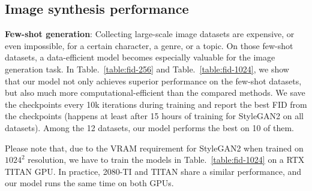 \documentclass{article} \usepackage{iclr2021_conference,times}
\begin{document}
\subsection{Image synthesis performance}
\textbf{Few-shot generation}: Collecting large-scale image datasets are expensive, or even impossible, for a certain character, a genre, or a topic. On those few-shot datasets, a data-efficient model becomes especially valuable for the image generation task. In Table.~\ref{table:fid-256} and Table.~\ref{table:fid-1024}, we show that our model not only achieves superior performance on the few-shot datasets, but also much more computational-efficient than the compared methods. We save the checkpoints every 10k iterations during training and report the best FID from the checkpoints (happens at least after 15 hours of training for StyleGAN2 on all datasets). Among the 12 datasets, our model performs the best on 10 of them.

Please note that, due to the VRAM requirement for StyleGAN2 when trained on $1024^2$ resolution, we have to train the models in Table.~\ref{table:fid-1024} on a RTX TITAN GPU. In practice, 2080-TI and TITAN share a similar performance, and our model runs the same time on both GPUs.

\begin{table}[h]
\vspace{-0mm}
\caption{FID comparison at $256^2$ resolution on few-sample datasets.}
\label{table:fid-256}
\vspace{-2mm}
\begin{center}
\end{center}
\vspace{-2mm}
\end{table}
\end{document}
